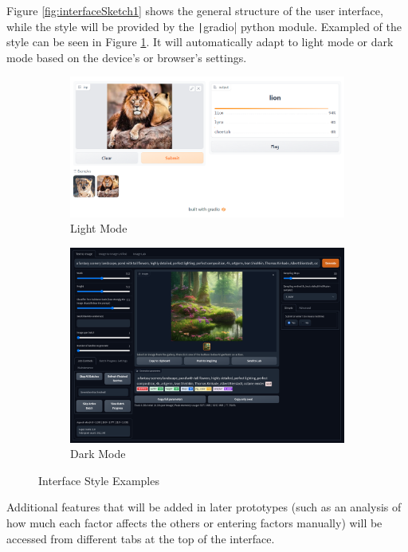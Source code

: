 \documentclass[12pt]{report}
\newcommand{\pil}[1]{\protect\texttt|#1|}
\begin{document}
Figure \ref{fig:interfaceSketch1} shows the general structure of the user interface, while the style will be provided by the \pil{gradio} python module. Exampled of the style can be seen in Figure \ref{fig:interfaceStyle}. It will automatically adapt to light mode or dark mode based on the device's or browser's settings.
\begin{figure}[H]
\centering
\begin{subfigure}{.8\textwidth}
    \centering
    \includegraphics[width=.9\linewidth]{lightModeInterface.png}
    \caption{Light Mode}
\end{subfigure}
\begin{subfigure}{.8\textwidth}
    \centering
    \includegraphics[width=.9\linewidth]{darkModeInterface.png}
    \caption{Dark Mode}
\end{subfigure}
\caption{Interface Style Examples}\label{fig:interfaceStyle}
\end{figure}

Additional features that will be added in later prototypes (such as an analysis of how much each factor affects the others or entering factors manually) will be accessed from different tabs at the top of the interface.
\end{document}
